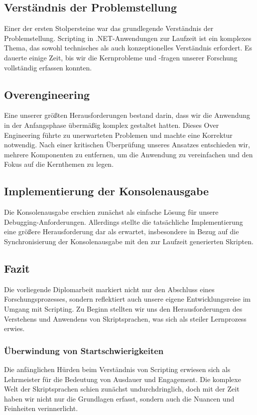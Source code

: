 \subsection*{Verständnis der Problemstellung}
Einer der ersten Stolpersteine war das grundlegende Verständnis der Problemstellung. 
Scripting in .NET-Anwendungen zur Laufzeit ist ein komplexes Thema, das sowohl technisches 
als auch konzeptionelles Verständnis erfordert. Es dauerte einige Zeit, bis wir die 
Kernprobleme und -fragen unserer Forschung vollständig erfassen konnten.

\subsection*{Overengineering}
Eine unserer größten Herausforderungen bestand darin, dass wir die Anwendung in der 
Anfangsphase übermäßig komplex gestaltet hatten. Dieses Over Engineering führte zu 
unerwarteten Problemen und machte eine Korrektur notwendig. Nach einer kritischen 
Überprüfung unseres Ansatzes entschieden wir, mehrere Komponenten zu entfernen, 
um die Anwendung zu vereinfachen und den Fokus auf die Kernthemen zu legen.

\subsection*{Implementierung der Konsolenausgabe}
Die Konsolenausgabe erschien zunächst als einfache Lösung für unsere Debugging-Anforderungen. 
Allerdings stellte die tatsächliche Implementierung eine größere Herausforderung dar als erwartet,
insbesondere in Bezug auf die Synchronisierung der Konsolenausgabe mit den zur Laufzeit 
generierten Skripten.

\newpage
\subsection*{Fazit}
Die vorliegende Diplomarbeit markiert nicht nur den Abschluss eines Forschungsprozesses, 
sondern reflektiert auch unsere eigene Entwicklungsreise im Umgang mit Scripting. Zu Beginn 
stellten wir uns den Herausforderungen des Verstehens und Anwendens von Skriptsprachen, 
was sich als steiler Lernprozess erwies.

\subsubsection*{Überwindung von Startschwierigkeiten}

Die anfänglichen Hürden beim Verständnis von Scripting erwiesen sich als Lehrmeister für 
die Bedeutung von Ausdauer und Engagement. Die komplexe Welt der Skriptsprachen schien 
zunächst undurchdringlich, doch mit der Zeit haben wir nicht nur die Grundlagen erfasst, 
sondern auch die Nuancen und Feinheiten verinnerlicht.

